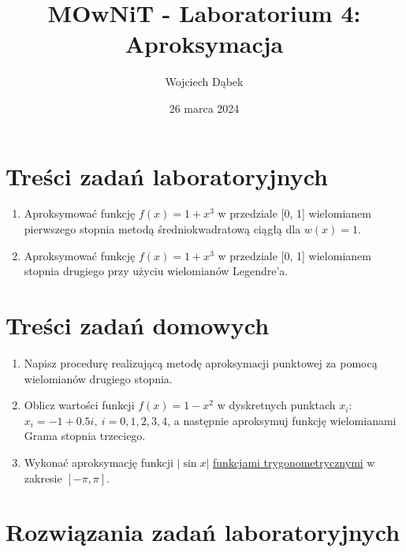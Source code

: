 \documentclass{article}
\title{MOwNiT - Laboratorium 4:\\
Aproksymacja}
\author{Wojciech Dąbek}
\date{26 marca 2024}
\begin{document}
\maketitle

\section{Treści zadań laboratoryjnych}

\begin{enumerate}
    \item Aproksymować funkcję \(f(x) = 1 + x^3\) w przedziale [0, 1] wielomianem pierwszego stopnia metodą średniokwadratową ciągłą dla \(w(x) = 1\).
    \item Aproksymować funkcję \(f(x) = 1 + x^3\) w przedziale [0, 1] wielomianem stopnia drugiego przy użyciu wielomianów Legendre'a.
\end{enumerate}

\section{Treści zadań domowych}

\begin{enumerate}
    \item Napisz procedurę realizującą metodę aproksymacji punktowej za pomocą wielomianów drugiego stopnia.
    \item Oblicz wartości funkcji \(f(x) = 1 - x^2\) w dyskretnych punktach \(x_i:\)\\
    \(x_i = -1 + 0.5i,\ i = 0, 1, 2, 3, 4\), a następnie aproksymuj funkcję wielomianami Grama stopnia trzeciego.
    \item Wykonać aproksymację funkcji \(|\sin x|\) \href{https://pl.wikipedia.org/wiki/Szereg_Fouriera}{funkcjami trygonometrycznymi} w zakresie \([-\pi, \pi]\).
\end{enumerate}

\section{Rozwiązania zadań laboratoryjnych}
\end{document}
